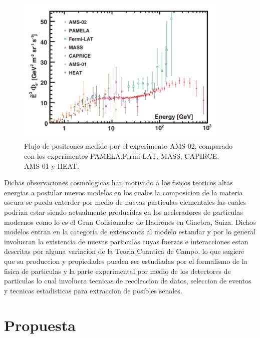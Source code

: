 \begin{figure}
\begin{center}
 \includegraphics[width=4.0in]{AMS_positronflux.png}
  \caption{Flujo de positrones medido por el experimento AMS-02, comparado con los experimentos PAMELA,Fermi-LAT, MASS, CAPIRCE, AMS-01 y HEAT.}
 \label{fig:AMS_positron}
 \end{center}
\end{figure}

Dichas observaciones cosmologicas han motivado a los fisicos teoricos 
altas energias a postular nuevos modelos en los cuales la composicion de la materia oscura se pueda enterder por medio de nuevas particulas elementales  las cuales podrian estar siendo actualmente producidas en los aceleradores de particulas modernos como lo es el Gran Colisionador de Hadrones en Ginebra, Suiza.  Dichos modelos entran en la categoria de extensiones al modelo estandar y por lo general involucran la existencia de nuevas particulas cuyas fuerzas e interacciones estan descritas por alguna variacion de la Teoria Cuantica de Campo, lo que sugiere que su produccion y propiedades pueden ser estudiadas por el formalismo de la fisica de particulas y la parte experimental por medio de los detectores de particulas lo cual involucra tecnicas de recoleccion de datos, seleccion de eventos y tecnicas estadisticas para extraccion de posibles senales.  

\chapter{Propuesta}

